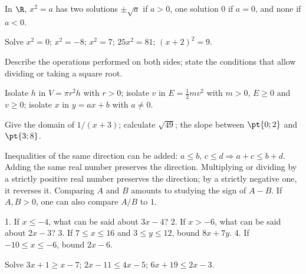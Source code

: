 \begin{keypoint}[Reminder]
In $\R$, $x^2=a$ has two solutions $\pm\sqrt a$ if $a>0$, one solution $0$ if $a=0$, and none if $a<0$.
\end{keypoint}
\begin{example}Solve $x^2=0$; $x^2=-8$; $x^2=7$; $25x^2=81$; $(x+2)^2=9$.\end{example}
\begin{method}
Describe the operations performed on both sides; state the conditions that allow dividing or taking a square root.
\end{method}
\begin{example}Isolate $h$ in $V=\pi r^2h$ with $r>0$; isolate $v$ in $E=\frac12mv^2$ with $m>0$, $E\geq0$ and $v\geq0$; isolate $x$ in $y=ax+b$ with $a\ne0$.\end{example}
\begin{fluency}[5--10 min]Give the domain of $1/(x+3)$; calculate $\sqrt{49}$; the slope between $\pt{0;2}$ and $\pt{3;8}$.\end{fluency}

\begin{keypoint}[Rules]
Inequalities of the same direction can be added: $a\leq b$, $c\leq d\Rightarrow a+c\leq b+d$. Adding the same real number preserves the direction. Multiplying or dividing by a strictly positive real number preserves the direction; by a strictly negative one, it reverses it.
Comparing $A$ and $B$ amounts to studying the sign of $A-B$. If $A,B>0$, one can also compare $A/B$ to $1$.
\end{keypoint}
\begin{example}1. If $x\leq-4$, what can be said about $3x-4$? 2. If $x>-6$, what can be said about $2x-3$? 3. If $7\leq x\leq16$ and $3\leq y\leq12$, bound $8x+7y$. 4. If $-10\leq x\leq-6$, bound $2x-6$.\end{example}
\begin{example}Solve $3x+1\geq x-7$; $2x-11\leq4x-5$; $6x+19\leq2x-3$.\end{example}

